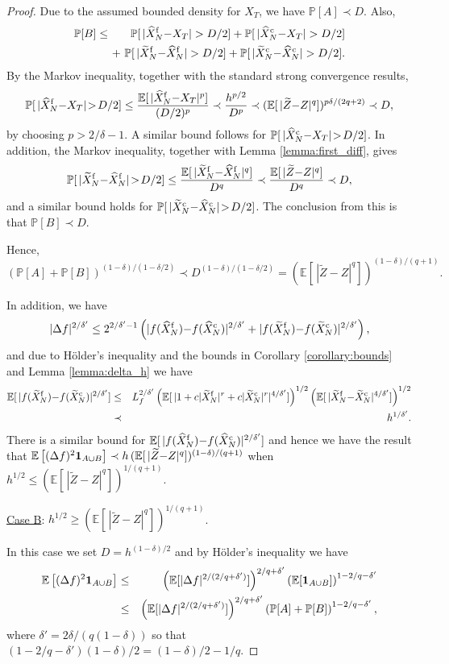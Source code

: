 \documentclass[review]{siamart190516}
\def \EE {{\mathbb{E}}}
\def \PP {{\mathbb{P}}}
\def \one {{\bf 1}}
\def \tZ {{\widetilde{Z}}}
\def \tXf  {{\widetilde{X}^{\rm f}}}
\def \tXc  {{\widetilde{X}^{\rm c}}}
\def \hXf {{\widehat{X}^{\rm f}}}
\def \hXc {{\widehat{X}^{\rm c}}}
\begin{document}
\begin{proof}
Due to the assumed bounded density for $X_T$, we have
$\PP[A] \prec D$.  Also, 
\begin{eqnarray*}
\PP[B] &\leq&  ~
\PP[\, |\hXf_N {-} X_T| > D/2] +
\PP[\, |\hXc_N {-} X_T| > D/2]
\\ & & \!\!\!\! +\
\PP[\, |\tXf_N {-} \hXf_N| > D/2] +
\PP[\, |\tXc_N {-} \hXc_N| > D/2].
\end{eqnarray*}
By the Markov inequality, together with the standard strong convergence
results,
\[
\PP[\, |\hXf_N {-} X_T| \!>\! D/2] 
\leq \frac{\EE[\, |\hXf_N {-} X_T|^p]}{(D/2)^p}
\prec \frac{h^{p/2}}{D^p}
\prec (\EE[\, |\tZ{-}Z|^q])^{p\delta/(2q+2)}
\prec D,
\]
by choosing $p>2/\delta - 1$.  A similar bound follows for
$\PP[\, |\hXc_N {-} X_T| \!>\! D/2]$.
In addition, the Markov inequality, together with Lemma \ref{lemma:first_diff}, gives
\[
\PP[\, |\tXf_N {-} \hXf_N| \!>\! D/2] 
\leq \frac{\EE[\, |\tXf_N {-} \hXf_N|^q]}{D^q}
\prec \frac{\EE[\, |\tZ{-}Z|^q]}{D^q} 
\prec D,
\]
and a similar bound holds for $\PP[\, |\tXc_N {-} \hXc_N| \!>\! D/2]$.
The conclusion from this is that $\PP[B]\prec D$.

Hence,
\[
\left( \PP[A] + \PP[B] \right)^{(1-\delta)/(1-\delta/2)} \prec D^{(1-\delta)/(1-\delta/2)}
 =  (\EE[\, |\tZ{-}Z|^q])^{(1-\delta)/(q+1)}.
\]

In addition, we have
\[
|\Delta f|^{2/\delta'} \leq 2^{2/\delta'-1}\left(
  |f(\hXf_N) {-} f(\hXc_N)|^{2/\delta'} + |f(\tXf_N) {-} f(\tXc_N)|^{2/\delta'}
  \right),
\]
and due to H\"older's inequality and the bounds in Corollary \ref{corollary:bounds}
and Lemma \ref{lemma:delta_h} we have
\begin{eqnarray*}
\EE[\,|f(\tXf_N) {-} f(\tXc_N)|^{2/\delta'}]
&\leq& L_f^{2/\delta'} \left( \EE[\, |1 + c |\tXf_N|^r + c |\tXc_N|^r|^{4/\delta'}]\right)^{1/2}
       \left( \EE[\, |\tXf_N {-} \tXc_N|^{4/\delta'}]\right)^{1/2}
       \\ &\prec& h^{1/\delta'}.
\end{eqnarray*}
There is a similar bound for $\EE[\,|f(\hXf_N) {-} f(\hXc_N)|^{2/\delta'}]$
and hence we have the result that 
$\EE\left[ (\Delta f)^2 \one_{A\cup B} \right]
\prec h \, (\EE[\, |\tZ{-}Z|^q])^{(1-\delta)/(q+1)}$
when $h^{1/2}\leq  (\EE[\, |\tZ{-}Z|^q])^{1/(q+1)}$.


\vspace{0.2in}

\underline{Case B}: $h^{1/2} \geq (\EE[\, |\tZ{-}Z|^q])^{1/(q+1)}$.

In this case we set $D\!=\!h^{(1-\delta)/2}$ and by H\"older's
inequality we have
\begin{eqnarray*}
\EE\left[ (\Delta f)^2 \one_{A\cup B} \right]
&\leq& \left( \EE[ |\Delta f|^{2/(2/q+\delta')}] \right)^{2/q +\delta'}
       \left( \EE[\one_{A\cup B}] \right)^{1-2/q-\delta'}
\\ &\leq& \left( \EE[ |\Delta f|^{2/(2/q+\delta')}] \right)^{2/q+\delta'}
          \left( \PP[A] + \PP[B] \right)^{1-2/q-\delta'},
\end{eqnarray*}
where $\delta'= 2\delta/(q(1{-}\delta))$ so that 
$(1{-}2/q{-}\delta')(1{-}\delta)/2 = (1{-}\delta)/2 - 1/q$.


\end{proof}
\end{document}
